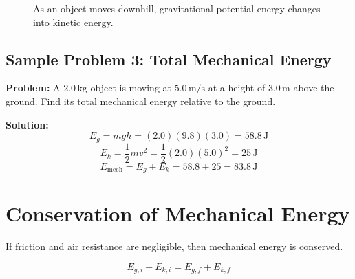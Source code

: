 \begin{figure}[h]
    \centering
    \caption{As an object moves downhill, gravitational potential energy changes into kinetic energy.}
\end{figure}

\subsection*{Sample Problem 3: Total Mechanical Energy}
\textbf{Problem:} A $2.0\,\text{kg}$ object is moving at $5.0\,\text{m/s}$ at a height of $3.0\,\text{m}$ above the ground. Find its total mechanical energy relative to the ground.

\textbf{Solution:}
\begin{equation*}
    E_g = mgh = (2.0)(9.8)(3.0) = 58.8\,\text{J}
\end{equation*}
\begin{equation*}
    E_k = \frac{1}{2}mv^2 = \frac{1}{2}(2.0)(5.0)^2 = 25\,\text{J}
\end{equation*}
\begin{equation*}
    E_{\text{mech}} = E_g + E_k = 58.8 + 25 = 83.8\,\text{J}
\end{equation*}

\section{Conservation of Mechanical Energy}
If friction and air resistance are negligible, then mechanical energy is conserved.

\begin{equation}
    E_{g,i} + E_{k,i} = E_{g,f} + E_{k,f}
\end{equation}

